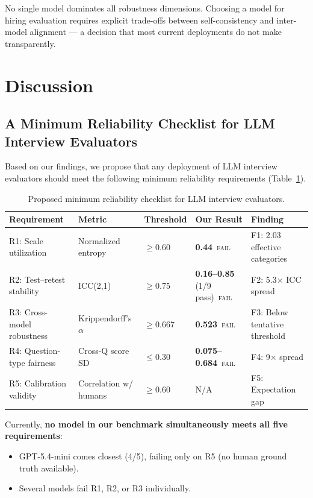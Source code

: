 \documentclass{article}
\begin{document}
No single model dominates all robustness dimensions. Choosing a model for hiring evaluation requires explicit trade-offs between self-consistency and inter-model alignment --- a decision that most current deployments do not make transparently.

\section{Discussion}\label{sec:discussion}

\subsection{A Minimum Reliability Checklist for LLM Interview Evaluators}

Based on our findings, we propose that any deployment of LLM interview evaluators should meet the following minimum reliability requirements (Table~\ref{tab:checklist}).

\begin{table}[h]
\caption{Proposed minimum reliability checklist for LLM interview evaluators.}
\label{tab:checklist}
\centering
\small
\begin{tabular}{llllp{2.8cm}}
\toprule
\textbf{Requirement} & \textbf{Metric} & \textbf{Threshold} & \textbf{Our Result} & \textbf{Finding} \\
\midrule
R1: Scale utilization & Normalized entropy & $\geq 0.60$ & \textbf{0.44}~\textsc{fail} & F1: 2.03 effective categories \\
R2: Test--retest stability & ICC(2,1) & $\geq 0.75$ & \textbf{0.16--0.85} (1/9 pass)~\textsc{fail} & F2: 5.3$\times$ ICC spread \\
R3: Cross-model robustness & Krippendorff's $\alpha$ & $\geq 0.667$ & \textbf{0.523}~\textsc{fail} & F3: Below tentative threshold \\
R4: Question-type fairness & Cross-Q score SD & $\leq 0.30$ & \textbf{0.075--0.684}~\textsc{fail} & F4: 9$\times$ spread \\
R5: Calibration validity & Correlation w/ humans & $\geq 0.60$ & N/A & F5: Expectation gap \\
\bottomrule
\end{tabular}
\end{table}

Currently, \textbf{no model in our benchmark simultaneously meets all five requirements}:
\begin{itemize}
  \item GPT-5.4-mini comes closest (4/5), failing only on R5 (no human ground truth available).
  \item Several models fail R1, R2, or R3 individually.
\end{itemize}
\end{document}
